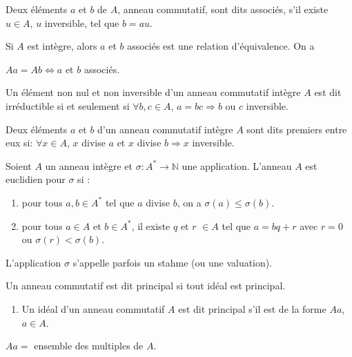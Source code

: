 \documentclass[12pt,a4paper]{article}
\begin{document}
\begin{flushleft}
\begin{mydef}
Deux éléments $a$ et $b$ de $A$, anneau commutatif, sont dits associés, s'il existe $u \in A$, $u$ inversible, tel que $ b = au$.
\end{mydef}

\begin{prop}
Si $A$ est intègre, alors $a$ et $b$ associés est une relation d'équivalence. On a\\
\begin{center}
$Aa = Ab \Leftrightarrow a $ et $b$ associés.
\end{center}
\end{prop}

\begin{mydef}
Un élément non nul et non inversible d'un anneau commutatif intègre $A$ est dit irréductible si et seulement si  $\forall b , c \in A$, $a = bc \Rightarrow b $ ou $c$ inversible.
\end{mydef}

\begin{mydef}
Deux éléments $a$ et $b$ d'un anneau commutatif intègre $A$ sont dits premiers entre eux si: $\forall x \in A$, $x $ divise $a$ et $x$ divise $b \Rightarrow x$ inversible.
\end{mydef}

\begin{mydef}
Soient $A$ un anneau intègre et $\sigma : A^* \longrightarrow \mathbb{N}$ une application. L'anneau $A$ est euclidien pour $\sigma$ si :
\begin{enumerate}
\item pour tous $a, b \in A^*$ tel que $a$ divise $b$, on a $\sigma(a) \leq \sigma(b)$.
\item pour tous $a \in A$ et $b \in A^*$, il existe $q$ et $r$ $\in A$ tel que $a = bq + r$ avec $r = 0$ ou $\sigma(r) < \sigma(b)$.
\end{enumerate}
L'application $\sigma$ s'appelle parfois un stahme (ou une valuation).
\end{mydef}

\begin{mydef}
Un anneau commutatif est dit principal si tout idéal est principal.
\begin{enumerate}
\item Un idéal d'un anneau commutatif $A$ est dit principal s'il est de la forme $Aa$, $a \in A$.
\end{enumerate}
\end{mydef}

\begin{rem}
$Aa = $ ensemble des multiples de $A$.
\end{rem}


\end{flushleft}
\end{document}
